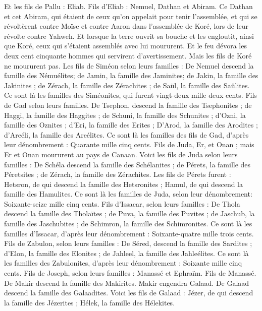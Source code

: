 \begin{multicols}{2}
Et les fils de Pallu : Eliab.
Fils d'Eliab : Nemuel, Dathan et Abiram. Ce Dathan et cet Abiram, qui étaient de ceux qu’on appelait pour tenir l’assemblée, et qui se révoltèrent contre Moïse et contre Aaron dans l'assemblée de Koré, lors de leur révolte contre Yahweh.
Et lorsque la terre ouvrit sa bouche et les engloutit, ainsi que Koré, ceux qui s'étaient assemblés avec lui moururent. Et le feu dévora les deux cent cinquante hommes qui servirent d'avertissement.
Mais les fils de Koré ne moururent pas.
Les fils de Siméon selon leurs familles : De Nemuel descend la famille des Némuélites; de Jamin, la famille des Jaminites; de Jakin, la famille des Jakinites ;
de Zérach, la famille des Zérachites ; de Saül, la famille des Saülites.
Ce sont là les familles des Siméonites, qui furent vingt-deux mille deux cents.
Fils de Gad selon leurs familles. De Tsephon, descend la famille des Tsephonites ; de Haggi, la famille des Haggites ; de Schuni, la famille des Schunites ;
d'Ozni, la famille des Oznites ; d'Eri, la famille des Erites ;
D'Arod, la famille des Arodites ; d'Areéli, la famille des Areélites.
Ce sont là les familles des fils de Gad, d'après leur dénombrement : Quarante mille cinq cents.
Fils de Juda, Er, et Onan ; mais Er et Onan moururent au pays de Canaan.
Voici les fils de Juda selon leurs familles : De Schéla descend la famille des Schélanites ; de Pérets, la famille des Péretsites ; de Zérach, la famille des Zérachites.
Les fils de Pérets furent : Hetsron, de qui descend la famille des Hetsronites ; Hamul, de qui descend la famille des Hamulites.
Ce sont là les familles de Juda, selon leur dénombrement: Soixante-seize mille cinq cents.
Fils d'Issacar, selon leurs familles : De Thola descend la famille des Tholaïtes ; de Puva, la famille des Puvites ;
de Jaschub, la famille des Jaschubites ; de Schimron, la famille des Schimronites.
Ce sont là les familles d'Issacar, d'après leur dénombrement : Soixante-quatre mille trois cents.
Fils de Zabulon, selon leurs familles : De Séred, descend la famille des Sardites ; d'Elon, la famille des Elonites ; de Jahleel, la famille des Jahleélites.
Ce sont là les familles des Zabulonites, d'après leur dénombrement : Soixante mille cinq cents.
Fils de Joseph, selon leurs familles : Manassé et Ephraïm.
Fils de Manassé. De Makir descend la famille des Makirites. Makir engendra Galaad. De Galaad descend la famille des Galaadites.
Voici les fils de Galaad : Jézer, de qui descend la famille des Jézerites ; Hélek, la famille des Hélekites.

\end{multicols}
